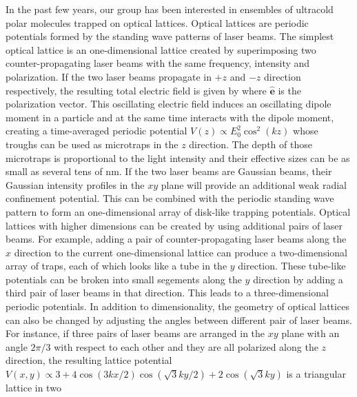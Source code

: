In the past few years, our group has been interested in ensembles of ultracold polar molecules trapped on optical lattices.  Optical lattices are
 periodic potentials formed by the standing wave patterns of  laser 
 beams\cite{Jessen1996, phillips1998}. 
The simplest optical lattice is an one-dimensional lattice created by  superimposing two counter-propagating laser 
beams 
with the same frequency, intensity and polarization.  If the two laser beams propagate in $+z$ and $-z$ direction respectively, the 
resulting total electric field is given by
where $\mathbf{\hat{e}}$ is the polarization vector. This oscillating electric field induces an oscillating dipole moment in a
particle and at the same time interacts with the dipole moment, creating a time-averaged periodic potential $V(z) \propto E_0^2  \cos^2 (k z)$ whose troughs can be used as microtraps in the $z$ direction.  The depth of those microtraps is 
proportional to the light intensity and their effective sizes can be as small as several tens of nm. If the two laser 
beams are Gaussian beams, their Gaussian intensity profiles in the $xy$ plane will provide an additional weak radial 
confinement potential. This can be combined with the periodic standing wave pattern to form an one-dimensional array of  disk-like 
trapping potentials. Optical lattices with higher dimensions can be created by using additional pairs of laser beams. For example,
adding a pair of counter-propagating laser beams along the $x$ direction to the current one-dimensional lattice can 
produce a two-dimensional array of traps, each of which looks like a tube in the $y$ direction. These tube-like potentials 
can be broken into small segements along the $y$ direction by adding a third pair of  laser beams in that direction.
This leads to a three-dimensional periodic potentials. 
In addition to dimensionality, the geometry of optical lattices can also be changed by adjusting the angles between different pair of laser beams. For instance, if three pairs of laser beams are arranged in the $xy$ 
plane with an angle $2\pi/3$ with respect to each other and they are all polarized along the $z$ direction, the resulting
lattice potential $V(x, y) \propto 3 + 4\cos(3 k x/2)\cos(\sqrt{3}ky/2) + 2\cos(\sqrt{3}ky)$ is a triangular lattice in two
